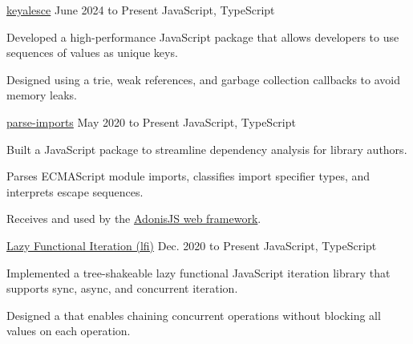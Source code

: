 
\begin{cventry}
    {\href{https://github.com/TomerAberbach/keyalesce}{keyalesce}}{}
    {June 2024 to Present}
    {JavaScript, TypeScript}
    \begin{cvitems}
        \item Developed a high-performance JavaScript package that allows developers to use sequences of values as unique keys.
        \item Designed  using a trie, weak references, and garbage collection callbacks to avoid memory leaks.
    \end{cvitems}
\end{cventry}

\begin{cventry}
    {\href{https://github.com/TomerAberbach/parse-imports}{parse-imports}}{}
    {May 2020 to Present}
    {JavaScript, TypeScript}
    \begin{cvitems}
        \item Built a JavaScript package to streamline dependency analysis for library authors.
        \item Parses ECMAScript module imports, classifies import specifier types, and interprets escape sequences.
        \item Receives  and used by the \href{https://adonisjs.com}{AdonisJS web framework}.
    \end{cvitems}
\end{cventry}

\begin{cventry}
    {\href{https://github.com/TomerAberbach/lfi}{Lazy Functional Iteration (lfi)}}{}
    {Dec. 2020 to Present}
    {JavaScript, TypeScript}
    \begin{cvitems}
        \item Implemented a tree-shakeable lazy functional JavaScript iteration library that supports sync, async, and concurrent iteration.
        \item Designed a  that enables chaining concurrent operations without blocking all values on each operation.
    \end{cvitems}
\end{cventry}

